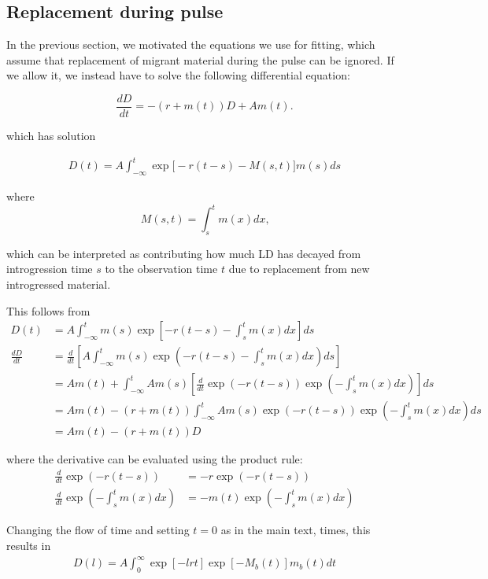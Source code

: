 \documentclass[11pt]{article}
\begin{document}
\subsection{Replacement during pulse}\label{Appendix_2}

In the previous section, we motivated the equations we use for fitting, which assume that replacement of migrant material during the pulse can be ignored. If we allow it, we instead 
have to solve the following differential equation:

\begin{equation}
    \frac{dD}{dt} = -(r + m(t)) D + A m(t)\text{.}
\end{equation}

which has solution

\begin{align}
    D(t) = A\int_{-\infty}^t \exp\big[-r(t -s) - M(s,t)\big] m(s) ds
\end{align}

where $$M(s,t) = \int_s^t m(x)dx \text{,}$$

which can be interpreted as contributing how much LD has decayed from introgression time $s$ to the observation time $t$ due to replacement from new introgressed material.

This follows from 
\begin{align}
   D(t) &= A\int_{-\infty}^t m(s)\exp\left[-r(t-s) - \int_{s}^tm(x)dx\right] ds \nonumber \\
   \frac{d D}{dt} &= \frac{d}{dt}\left[ A\int_{-\infty}^t m(s)\exp\left(-r(t-s)-\int_{s}^tm(x)dx\right) ds \right]\nonumber\\
   &= A m(t) + \int_{-\infty}^t A m(s)\left[\frac{d}{dt}\exp\left(-r(t-s)\right)\exp\left(-\int_{s}^tm(x)dx\right)\right]ds \nonumber\\
&= A m(t) - (r + m(t)) \int_{-\infty}^t A m(s)\exp\left(-r(t-s)\right)\exp\left(-\int_{s}^tm(x)dx\right)ds \nonumber\\   
&=A m(t) - (r + m(t)) D
  \end{align}
  
where the derivative can be evaluated using the product rule:
\begin{align}
    \frac{d}{dt}\exp\left(-r(t-s)\right) & =  -r\exp(-r(t-s)) \nonumber\\
    \frac{d}{dt}\exp\left(-\int_{s}^tm(x)dx\right) &=
    -m(t)\exp\left(-\int_{s}^tm(x)dx\right)\nonumber
\end{align}

Changing the flow of time and setting $t=0$ as in the main text, times,  this results in
\begin{align}
    D(l) = A\int_0^\infty \exp[-lrt] \exp[-M_b(t)] m_b(t) dt
\end{align}
\end{document}
